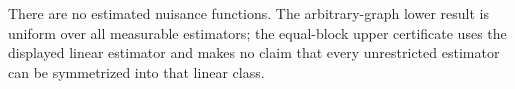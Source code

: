 There are no estimated nuisance functions.  The arbitrary-graph lower result is uniform over all measurable estimators; the equal-block upper certificate uses the displayed linear estimator and makes no claim that every unrestricted estimator can be symmetrized into that linear class.